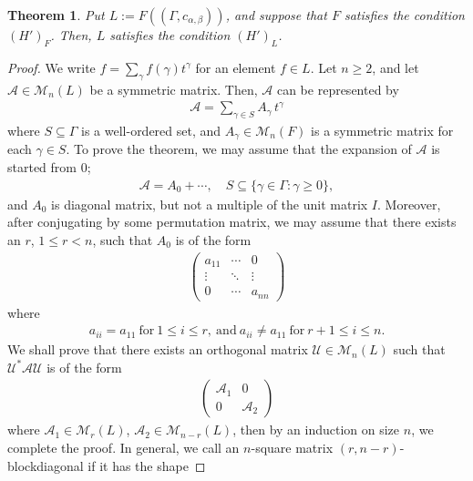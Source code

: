 \documentclass[12pt]{amsart}
\theoremstyle{plain}
\newtheorem{thm}[prop] {Theorem}
\theoremstyle{definition}
\begin{document}
\begin{thm} \label{b2}
  Put $L := F((\Gamma, c_{\alpha, \beta}))$, and suppose that $F$ satisfies the condition $(H')_F$. Then, $L$ satisfies the condition $(H')_L$.
\end{thm}
\begin{proof}
  We write $f = \sum_{\gamma}f(\gamma)t^{\gamma}$ for an element $f \in L$. Let $n \ge 2$, and let $\mathcal{A} \in \mathcal{M}_n(L)$ be a symmetric matrix. Then, $\mathcal{A}$ can be represented by
  \begin{align*}
    \mathcal{A} = \sum_{\gamma \in S} A_{\gamma}\, t^{\gamma}
  \end{align*}
  where $S \subseteq \Gamma$ is a well-ordered set, and $A_{\gamma} \in \mathcal{M}_n(F)$ is a symmetric matrix for each $\gamma \in S$. To prove the theorem, we may assume that the expansion of $\mathcal{A}$ is started from $0$;
  \begin{align*}
    \mathcal{A} = A_0 + \cdots, \quad S \subseteq \{\gamma \in \Gamma : \gamma \ge 0\},
  \end{align*}
  and $A_0$ is diagonal matrix, but not a multiple of the unit matrix $I$. Moreover, after conjugating by some permutation matrix, we may assume that there exists an $r$, $1 \le r < n$, such that $A_0$ is of the form
  \begin{gather*}
    \begin{pmatrix}
      a_{11} & \cdots & 0 \\
      \vdots & \ddots & \vdots \\
      0 & \cdots & a_{nn}
    \end{pmatrix} 
  \end{gather*}
  where
  \begin{align*}
    a_{ii} = a_{11} \ \text{for} \ 1 \le i \le r, \ \text{and} \ a_{ii} \neq a_{11} \ \text{for} \ r+1 \le i \le n.
  \end{align*}
  We shall prove that there exists an orthogonal matrix $\mathcal{U} \in \mathcal{M}_n(L)$ such that $\mathcal{U}^* \mathcal{A} \mathcal{U}$ is of the form
  \begin{align*}
    \begin{pmatrix}
      \mathcal{A}_1 & 0 \\
      0 & \mathcal{A}_2
    \end{pmatrix}
  \end{align*}
  where $\mathcal{A}_1 \in \mathcal{M}_{r}(L)$, $ \mathcal{A}_2 \in \mathcal{M}_{n-r}(L)$, then by an induction on size $n$, we complete the proof. In general, we call an $n$-square matrix $(r, n-r)$-blockdiagonal if it has the shape

\end{proof}
\end{document}

